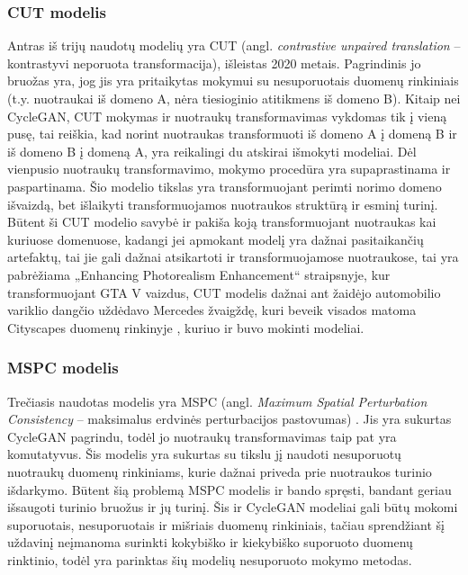 \documentclass{VUMIFPSbakalaurinis}
\begin{document}
        \subsubsection{CUT modelis}
            Antras iš trijų naudotų modelių yra CUT (angl. \emph{contrastive unpaired translation} – kontrastyvi neporuota transformacija), išleistas 2020 metais. Pagrindinis jo bruožas yra, jog jis yra pritaikytas mokymui su nesuporuotais duomenų rinkiniais (t.y. nuotraukai iš domeno A, nėra tiesioginio atitikmens iš domeno B). Kitaip nei CycleGAN, CUT mokymas ir nuotraukų transformavimas vykdomas tik į vieną pusę, tai reiškia, kad norint nuotraukas transformuoti iš domeno A į domeną B ir iš domeno B į domeną A, yra reikalingi du atskirai išmokyti modeliai. Dėl vienpusio nuotraukų transformavimo, mokymo procedūra yra supaprastinama ir paspartinama. Šio modelio tikslas yra transformuojant perimti norimo domeno išvaizdą, bet išlaikyti transformuojamos nuotraukos struktūrą ir esminį turinį. Būtent ši CUT modelio savybė ir pakiša koją transformuojant nuotraukas kai kuriuose domenuose, kadangi jei apmokant modelį yra dažnai pasitaikančių artefaktų, tai jie gali dažnai atsikartoti ir transformuojamose nuotraukose, tai yra pabrėžiama „Enhancing Photorealism Enhancement“ \cite{EnPhEn} straipsnyje, kur transformuojant GTA V vaizdus, CUT modelis dažnai ant žaidėjo automobilio variklio dangčio uždėdavo Mercedes žvaigždę, kuri beveik visados matoma Cityscapes duomenų rinkinyje \cite{DaimCityDaSe}, kuriuo ir buvo mokinti modeliai.
        \subsubsection{MSPC modelis}
            Trečiasis naudotas modelis yra MSPC (angl. \emph{Maximum Spatial Perturbation Consistency} – maksimalus erdvinės perturbacijos pastovumas) \cite{Mspc}. Jis yra sukurtas CycleGAN \cite{CycleGAN2017} pagrindu, todėl jo nuotraukų transformavimas taip pat yra komutatyvus. Šis modelis yra sukurtas su tikslu jį naudoti nesuporuotų nuotraukų duomenų rinkiniams, kurie dažnai priveda prie nuotraukos turinio išdarkymo. Būtent šią problemą MSPC modelis ir bando spręsti, bandant geriau išsaugoti turinio bruožus ir jų turinį. Šis ir CycleGAN modeliai gali būtų mokomi suporuotais, nesuporuotais ir mišriais duomenų rinkiniais, tačiau sprendžiant šį uždavinį neįmanoma surinkti kokybiško ir kiekybiško suporuoto duomenų rinktinio, todėl yra parinktas šių modelių nesuporuoto mokymo metodas.
\end{document}
